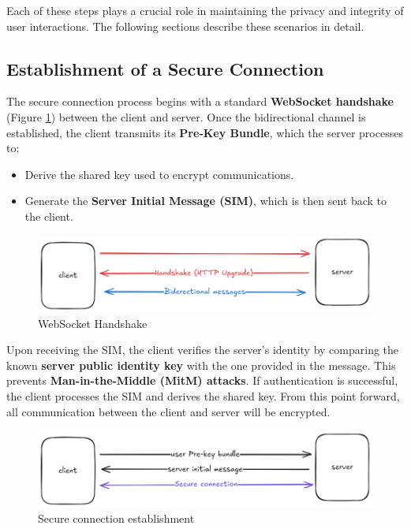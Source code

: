 Each of these steps plays a crucial role in maintaining the privacy and integrity of user interactions. The following sections describe these scenarios in detail.

\subsection{Establishment of a Secure Connection}
\label{subsec:EstablishmentOfASecureConnection}

The secure connection process begins with a standard \textbf{WebSocket handshake} (Figure \ref{fig:websocket-handshake}) between the client and server. Once the bidirectional channel is established, the client transmits its \textbf{Pre-Key Bundle}, which the server processes to:

\begin{itemize}
    \item Derive the shared key used to encrypt communications.
    \item Generate the \textbf{Server Initial Message (SIM)}, which is then sent back to the client.
\end{itemize}

\begin{figure}[!ht]
    \centering
    \includegraphics[width=0.8\linewidth]{imgs/Websocket.png}
    \caption{WebSocket Handshake}
    \label{fig:websocket-handshake}
\end{figure}

Upon receiving the SIM, the client verifies the server’s identity by comparing the known \textbf{server public identity key} with the one provided in the message. This prevents \textbf{Man-in-the-Middle (MitM) attacks}. If authentication is successful, the client processes the SIM and derives the shared key. From this point forward, all communication between the client and server will be encrypted.

\begin{figure}[!ht]
    \centering
    \includegraphics[width=0.8\linewidth]{imgs/secure-connection.png}
    \caption{Secure connection establishment}
    \label{fig:secure-connection}
\end{figure}

